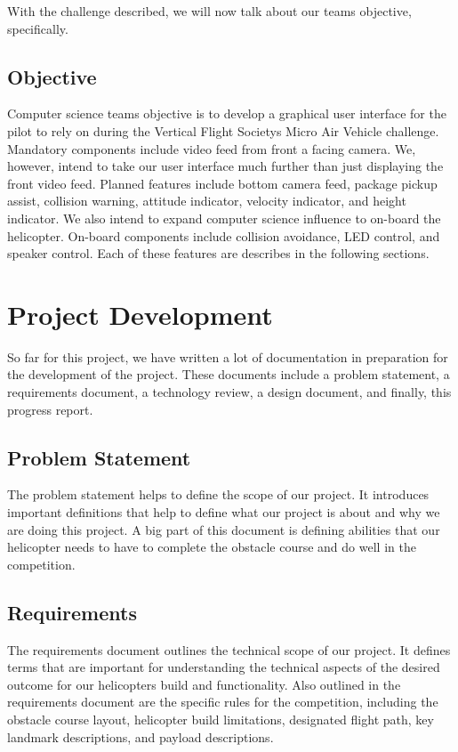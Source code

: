 \documentclass[onecolumn, oneside, letterpaper, draftclsnofoot, 10pt, compsoc]{IEEEtran}
\begin{document}
\noindent
With the challenge described, we will now talk about our team\textquotesingle s objective, specifically.

\subsection{Objective}
\noindent
Computer science team\textquotesingle s objective is to develop a graphical user interface for the pilot to rely on during the Vertical Flight Society\textquotesingle s Micro Air Vehicle challenge. Mandatory components include video feed from front a facing camera. We, however, intend to take our user interface much further than just displaying the front video feed. Planned features include bottom camera feed, package pickup assist, collision warning, attitude indicator, velocity indicator, and height indicator. We also intend to expand computer science influence to on-board the helicopter. On-board components include collision avoidance, LED control, and speaker control. Each of these features are describes in the following sections.


\section{Project Development}
\noindent
So far for this project, we have written a lot of documentation in preparation for the development of the project. These documents include a problem statement, a requirements document, a technology review, a design document, and finally, this progress report.
\subsection{Problem Statement}
\noindent
The problem statement helps to define the scope of our project. It introduces important definitions that help to define what our project is about and why we are doing this project. A big part of this document is defining abilities that our helicopter needs to have to complete the obstacle course and do well in the competition.
\subsection{Requirements}
\noindent
The requirements document outlines the technical scope of our project. It defines terms that are important for understanding the technical aspects of the desired outcome for our helicopter\textquotesingle s build and functionality. Also outlined in the requirements document are the specific rules for the competition, including the obstacle course layout, helicopter build limitations, designated flight path, key landmark descriptions, and payload descriptions.
\end{document}
